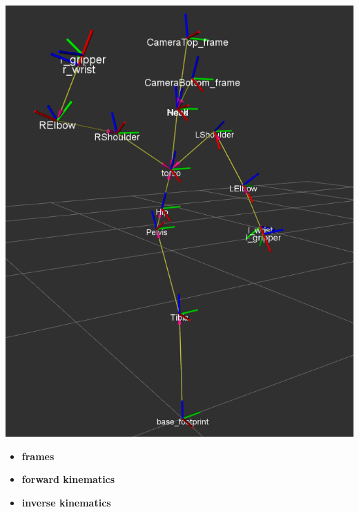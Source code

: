 \documentclass[compress]{beamer}
\begin{document}
\begin{frame}[plain]

    \begin{multicols}{2}

        \begin{center}
            \includegraphics[width=\linewidth]{frames_pepper}
        \end{center}
        \vfill\columnbreak

        \begin{itemize}
            \item \textbf{frames}
            \item \textbf{forward kinematics}
            \item \textbf{inverse kinematics}
        \end{itemize}

    \end{multicols}
\end{frame}
\end{document}
